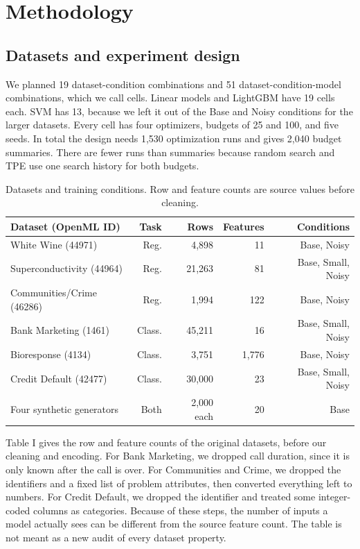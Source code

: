 \documentclass[12pt,letterpaper]{article}
\begin{document}
\section{Methodology}\label{methodology}

\subsection{Datasets and experiment design}\label{datasets-and-experiment-design}

We planned 19 dataset-condition combinations and 51 dataset-condition-model combinations, which we call cells. Linear models and LightGBM have 19 cells each. SVM has 13, because we left it out of the Base and Noisy conditions for the larger datasets. Every cell has four optimizers, budgets of 25 and 100, and five seeds. In total the design needs 1,530 optimization runs and gives 2,040 budget summaries. There are fewer runs than summaries because random search and TPE use one search history for both budgets.

\begin{table}[t]
\centering
\caption{Datasets and training conditions. Row and feature counts are source values before cleaning.}
\label{tab:datasets}
\fontsize{10}{12}\selectfont
\setlength{\tabcolsep}{3.3pt}
\begin{tabular}{lrrrr}
\toprule
Dataset (OpenML ID) & Task & Rows & Features & Conditions \\
\midrule
White Wine (44971) & Reg. & 4,898 & 11 & Base, Noisy \\
Superconductivity (44964) & Reg. & 21,263 & 81 & Base, Small, Noisy \\
Communities/Crime (46286) & Reg. & 1,994 & 122 & Base, Noisy \\
Bank Marketing (1461) & Class. & 45,211 & 16 & Base, Small, Noisy \\
Bioresponse (4134) & Class. & 3,751 & 1,776 & Base, Noisy \\
Credit Default (42477) & Class. & 30,000 & 23 & Base, Small, Noisy \\
Four synthetic generators & Both & 2,000 each & 20 & Base \\
\bottomrule
\end{tabular}
\end{table}

Table I gives the row and feature counts of the original datasets, before our cleaning and encoding. For Bank Marketing, we dropped call duration, since it is only known after the call is over. For Communities and Crime, we dropped the identifiers and a fixed list of problem attributes, then converted everything left to numbers. For Credit Default, we dropped the identifier and treated some integer-coded columns as categories. Because of these steps, the number of inputs a model actually sees can be different from the source feature count. The table is not meant as a new audit of every dataset property.
\end{document}
